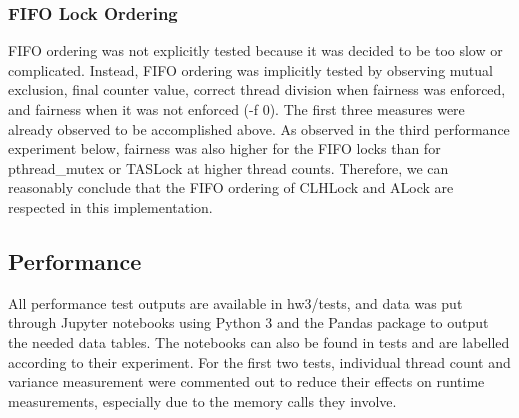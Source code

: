 \documentclass{article}
\begin{document}
\begin{adjustwidth}{-2cm}{-2cm}
\subsubsection{FIFO Lock Ordering}
FIFO ordering was not explicitly tested because it was decided to be too slow or complicated. Instead, FIFO ordering was implicitly tested by observing mutual exclusion, final counter value, correct thread division when fairness was enforced, and fairness when it was not enforced (-f 0). The first three measures were already observed to be accomplished above. As observed in the third performance experiment below, fairness was also higher for the FIFO locks than for pthread\_mutex or TASLock at higher thread counts. Therefore, we can reasonably conclude that the FIFO ordering of CLHLock and ALock are respected in this implementation.

\subsection{Performance}
All performance test outputs are available in hw3/tests, and data was put through Jupyter notebooks using Python 3 and the Pandas package to output the needed data tables. The notebooks can also be found in tests and are labelled according to their experiment. For the first two tests, individual thread count and variance measurement were commented out to reduce their effects on runtime measurements, especially due to the memory calls they involve.

\end{adjustwidth}
\end{document}
